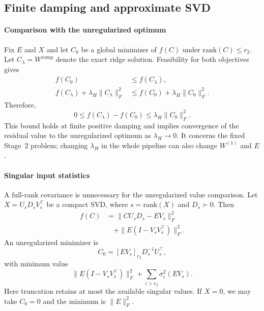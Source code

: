 \subsection{Finite damping and approximate SVD}\label{sup:two-step-approximation}

\paragraph{Comparison with the unregularized optimum}
Fix $E$ and $X$ and let $C_0$ be a global minimizer of $f(C)$ under $\mathrm{rank}(C)\le r_2$. Let $C_\lambda=W^{\mathrm{comp}}$ denote the exact ridge solution. Feasibility for both objectives gives
\begin{equation}
\begin{aligned}
f(C_0)&\le f(C_\lambda), \\
f(C_\lambda)+\lambda_H\|C_\lambda\|_F^2
&\le f(C_0)+\lambda_H\|C_0\|_F^2.
\end{aligned}
\end{equation}
Therefore,
\begin{equation}
0\le f(C_\lambda)-f(C_0)\le\lambda_H\|C_0\|_F^2.
\label{eq:sup-finite-damping-bound}
\end{equation}
This bound holds at finite positive damping and implies convergence of the residual value to the unregularized optimum as $\lambda_H\to0$. It concerns the fixed Stage~2 problem; changing $\lambda_H$ in the whole pipeline can also change $W^{(1)}$ and $E$.

\paragraph{Singular input statistics}
A full-rank covariance is unnecessary for the unregularized value comparison. Let $X=U_sD_sV_s^\top$ be a compact SVD, where $s=\mathrm{rank}(X)$ and $D_s\succ0$. Then
\begin{equation}
\begin{aligned}
f(C)
&=\|CU_sD_s-EV_s\|_F^2 \\
&\quad+\|E(I-V_sV_s^\top)\|_F^2.
\end{aligned}
\end{equation}
An unregularized minimizer is
\begin{equation}
C_0=[EV_s]_{r_2}D_s^{-1}U_s^\top,
\end{equation}
with minimum value
\begin{equation}
\|E(I-V_sV_s^\top)\|_F^2+\sum_{i>r_2}\sigma_i^2(EV_s).
\end{equation}
Here truncation retains at most the available singular values. If $X=0$, we may take $C_0=0$ and the minimum is $\|E\|_F^2$.

